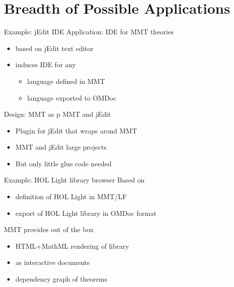 \documentclass{beamer}
\begin{document}
\section{Breadth of Possible Applications}


\begin{myframe}{Example: jEdit IDE}
Application: IDE for MMT theories 
\begin{itemize}
  \item based on jEdit text editor
  \item induces IDE for any
    \begin{itemize}
    \item language defined in MMT
    \item language exported to OMDoc
    \end{itemize}
\end{itemize}

Design: MMT as p MMT and jEdit
\begin{itemize}
 \item Plugin for jEdit that wraps arond MMT
 \item MMT and jEdit large projects
 \item But only little glue code needed
\end{itemize}
\end{myframe}

\begin{myframe}{Example: HOL Light library browser}
Based on
\begin{itemize}
 \item definition of HOL Light in MMT/LF
 \item export of HOL Light library in OMDoc format
\end{itemize}

MMT provides out of the box
  \begin{itemize}
    \item HTML+MathML rendering of library
    \item as interactive documents
    \item dependency graph of theorems
   \end{itemize}
\end{myframe}
\end{document}
